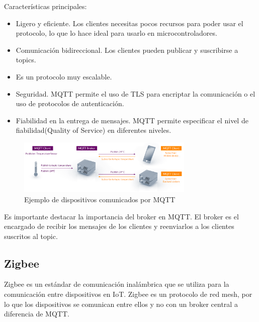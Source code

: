 \begin{titlepage}
Características principales:
\begin{itemize}
	\item Ligero y eficiente. Los clientes necesitas pocos recursos para poder usar el protocolo, lo que lo hace ideal para usarlo en microcontroladores.
	\item Comunicación bidireccional. Los clientes pueden publicar y suscribirse a topics.
	\item Es un protocolo muy escalable.
	\item Seguridad. MQTT permite el uso de TLS para encriptar la comunicación o el uso de protocolos de autenticación.
	\item Fiabilidad en la entrega de mensajes. MQTT permite especificar el nivel de fiabilidad(Quality of Service) en diferentes niveles. 
\end{itemize}
\begin{figure}[h!]
	\centering
	\includegraphics[width=0.75\textwidth]{imagenes/mqtt.png}
	\caption{Ejemplo de dispositivos comunicados por MQTT\cite{mqtt_img}}
\end{figure}

Es importante destacar la importancia del broker en MQTT. El broker es el encargado de recibir los mensajes de los clientes y reenviarlos a los clientes suscritos al topic. \\

\subsection{Zigbee}
Zigbee\cite{ref15} es un estándar de comunicación inalámbrica que se utiliza para la comunicación entre dispositivos en IoT. Zigbee es un protocolo de red mesh, por lo que los dispositivos se comunican entre ellos y no con un broker central a diferencia de MQTT.\\


\end{titlepage}
